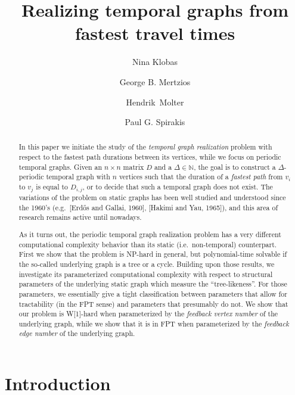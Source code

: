 \documentclass[a4paper,UKenglish,cleveref, autoref, thm-restate]{lipics-v2021}
\title{Realizing temporal graphs from fastest travel times} %
\author{Nina Klobas}{Department of Computer Science, Durham University, UK}{nina.klobas@durham.ac.uk}{ https://orcid.org/0000-0002-8024-5782}{}
\author{George B. Mertzios}{Department of Computer Science, Durham University, UK}{george.mertzios@durham.ac.uk}{https://orcid.org/0000-0001-7182-585X}{Supported by the EPSRC grant EP/P020372/1.}
\author{Hendrik~Molter}{Department of Computer Science, Ben-Gurion~University~of~the~Negev, 
Beer-Sheva, 
Israel}{molterh@post.bgu.ac.il}{https://orcid.org/0000-0002-4590-798X}{Supported by the ISF, grant No.~1456/18, and the ERC, grant number 949707.}
\author{Paul G. Spirakis}{Department of Computer Science, University of Liverpool, UK}{p.spirakis@liverpool.ac.uk}{https://orcid.org/0000-0001-5396-3749}{Supported by the EPSRC grant EP/P02002X/1.}
\begin{document}
\maketitle

\begin{abstract}
In this paper we initiate the study of the \emph{temporal graph realization} problem with respect to the fastest path durations between its vertices, 
while we focus on periodic temporal graphs. 
Given an $n \times n$ matrix $D$ and a $\Delta \in \mathbb{N}$, the goal is to construct a $\Delta$-periodic temporal graph with $n$ vertices 
such that the duration of a \emph{fastest path} from $v_i$ to $v_j$ is equal to $D_{i,j}$, or to decide that such a temporal graph does not exist. 
The variations of the problem on static graphs has been well studied and understood since the 1960's (e.g.\ [Erd\H{o}s and Gallai, 1960], [Hakimi and Yau, 1965]), and this area of research remains active until nowadays. 

As it turns out, the periodic temporal graph realization problem has a very different computational complexity behavior than its static (i.e.~non-temporal) counterpart. 
First we show that the problem is NP-hard in general, but polynomial-time solvable if the so-called underlying graph is a tree or a cycle.
Building upon those results, we investigate its parameterized computational complexity with respect to structural parameters of the underlying static graph which measure the ``tree-likeness''. For those parameters, we essentially give a tight classification between parameters that allow for tractability (in the FPT sense) and parameters that presumably do not.
We show that our problem is W[1]-hard when parameterized by the \emph{feedback vertex number} of the underlying graph, while we show that it is in FPT when parameterized by the \emph{feedback edge number} of the underlying graph. 





\end{abstract}



\section{Introduction}\label{intro-sec}
\end{document}
